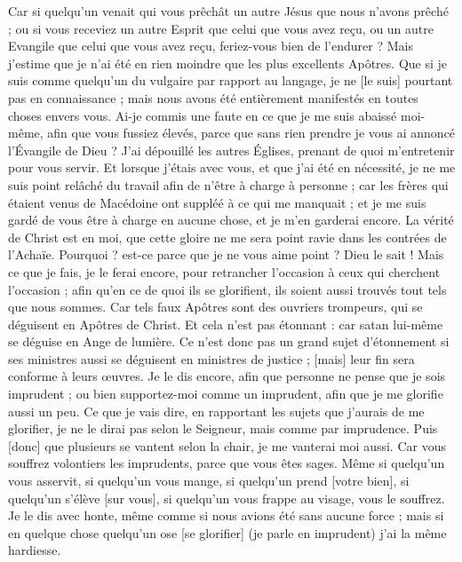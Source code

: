 \begin{multicols}{2}
Car si quelqu'un venait qui vous prêchât un autre Jésus que nous n'avons prêché ; ou si vous receviez un autre Esprit que celui que vous avez reçu, ou un autre Evangile que celui que vous avez reçu, feriez-vous bien de l'endurer ?
Mais j'estime que je n'ai été en rien moindre que les plus excellents Apôtres.
Que si je suis comme quelqu'un du vulgaire par rapport au langage, je ne [le suis] pourtant pas en connaissance ; mais nous avons été entièrement manifestés en toutes choses envers vous.
Ai-je commis une faute en ce que je me suis abaissé moi-même, afin que vous fussiez élevés, parce que sans rien prendre je vous ai annoncé l'Évangile de Dieu ?
J'ai dépouillé les autres Églises, prenant de quoi m'entretenir pour vous servir.
Et lorsque j'étais avec vous, et que j'ai été en nécessité, je ne me suis point relâché du travail afin de n'être à charge à personne ; car les frères qui étaient venus de Macédoine ont suppléé à ce qui me manquait ; et je me suis gardé de vous être à charge en aucune chose, et je m'en garderai encore.
La vérité de Christ est en moi, que cette gloire ne me sera point ravie dans les contrées de l'Achaïe.
Pourquoi ? est-ce parce que je ne vous aime point ? Dieu le sait !
Mais ce que je fais, je le ferai encore, pour retrancher l'occasion à ceux qui cherchent l'occasion ; afin qu'en ce de quoi ils se glorifient, ils soient aussi trouvés tout tels que nous sommes.
Car tels faux Apôtres sont des ouvriers trompeurs, qui se déguisent en Apôtres de Christ.
Et cela n'est pas étonnant : car satan lui-même se déguise en Ange de lumière.
Ce n'est donc pas un grand sujet d'étonnement si ses ministres aussi se déguisent en ministres de justice ; [mais] leur fin sera conforme à leurs œuvres.
Je le dis encore, afin que personne ne pense que je sois imprudent ; ou bien supportez-moi comme un imprudent, afin que je me glorifie aussi un peu.
Ce que je vais dire, en rapportant les sujets que j'aurais de me glorifier, je ne le dirai pas selon le Seigneur, mais comme par imprudence.
Puis [donc] que plusieurs se vantent selon la chair, je me vanterai moi aussi.
Car vous souffrez volontiers les imprudents, parce que vous êtes sages.
Même si quelqu'un vous asservit, si quelqu'un vous mange, si quelqu'un prend [votre bien], si quelqu'un s'élève [sur vous], si quelqu'un vous frappe au visage, vous le souffrez.
Je le dis avec honte, même comme si nous avions été sans aucune force ; mais si en quelque chose quelqu'un ose [se glorifier] (je parle en imprudent) j'ai la même hardiesse.

\end{multicols}
